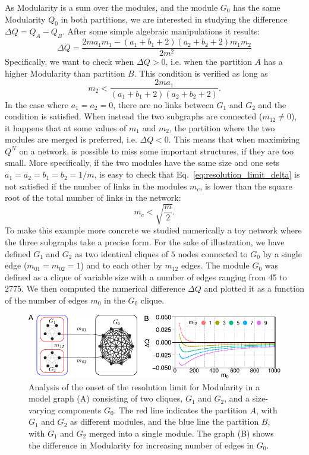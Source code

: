 As Modularity is a sum over the modules, and the module $G_0$ has the same Modularity $Q_0$ in both partitions, we are interested in studying the difference $\Delta Q = Q_{A} - Q_{B}$. After some simple algebraic manipulations it results:
\begin{equation} \label{eq:resolution_limit_delta}
\Delta Q = \frac{2 m a_1 m_1 - (a_1+b_1+2)(a_2+b_2+2)m_1 m_2}{2m^2}
\end{equation}
Specifically, we want to check when $\Delta Q > 0$, i.e. when the partition $A$ has a higher Modularity than partition $B$. This condition is verified as long as
\begin{equation}
m_2 < \frac{2m a_1}{(a_1+b_1+2)(a_2+b_2+2)}.
\end{equation}
In the case where $a_1=a_2=0$, there are no links between $G_1$ and $G_2$ and the condition is satisfied. When instead the two subgraphs are connected ($m_{12} \neq 0$), it happens that at some values of $m_1$ and $m_2$, the partition where the two modules are merged is preferred, i.e. $\Delta Q <0$. This means that when maximizing $Q^N$ on a network, is possible to miss some important structures, if they are too small.
More specifically, if the two modules have the same size and one sets $a_1=a_2=b_1=b_2=1/m$, is easy to check that Eq.~\ref{eq:resolution_limit_delta} is not satisfied if the number of links in the modules $m_c$, is lower than the square root of the total number of links in the network:
\begin{equation}
m_c < \sqrt{\frac{m}{2}}.
\end{equation}
To make this example more concrete we studied numerically a toy network where the three subgraphs take a precise form.
For the sake of illustration, we have defined $G_1$ and $G_2$ as two identical cliques of $5$ nodes connected to $G_0$ by a single edge ($m_{01}=m_{02}=1$) and to each other by $m_{12}$ edges.
The module $G_0$ was defined as a clique of variable size with a number of edges ranging from 45 to 2775. We then computed the numerical difference $\Delta Q$ and plotted it as a function of the number of edges $m_0$ in the $G_0$ clique.

\begin{figure}[htb!]
\centering
\includegraphics[width=1\textwidth]{images/barthelemy_modularity.pdf}
\caption{Analysis of the onset of the resolution limit for Modularity in a model graph (A) consisting of two cliques, $G_1$ and $G_2$, and a size-varying components $G_0$. The red line indicates the partition $A$, with $G_1$ and $G_2$ as different modules, and the blue line the partition $B$, with $G_1$ and $G_2$ merged into a single module. The graph (B) shows the difference in Modularity for increasing number of edges in $G_0$.}
\label{fig:figure_1_barthelemy}
\end{figure}

